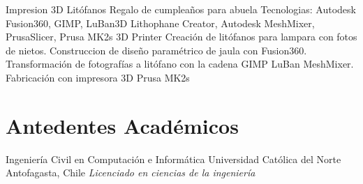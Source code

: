 \documentclass[draft,color,12pt,letterpaper,sans]{moderncv}
\begin{document}
\cventry {}
{Impresion 3D Lit\'ofanos}
{Regalo de cumpleaños para abuela}
{}
{\newline Tecnologias: Autodesk Fusion360, GIMP, LuBan3D Lithophane Creator, Autodesk MeshMixer, PrusaSlicer, Prusa MK2s 3D Printer}
{Creaci\'on de lit\'ofanos para lampara con fotos de nietos. Construccion de diseño param\'etrico de jaula con Fusion360.
Transformaci\'on de fotograf\'ias a lit\'ofano con la cadena GIMP \faArrowRight LuBan \faArrowRight MeshMixer. Fabricaci\'on con impresora 3D Prusa MK2s \newline}



\section{Antedentes Acad\'emicos}
{Ingenier\'ia Civil en Computaci\'on e Inform\'atica}
{Universidad Cat\'olica del Norte}
{Antofagasta, Chile}
{\textit{Licenciado en ciencias de la ingenier\'ia}}
{}
\end{document}
